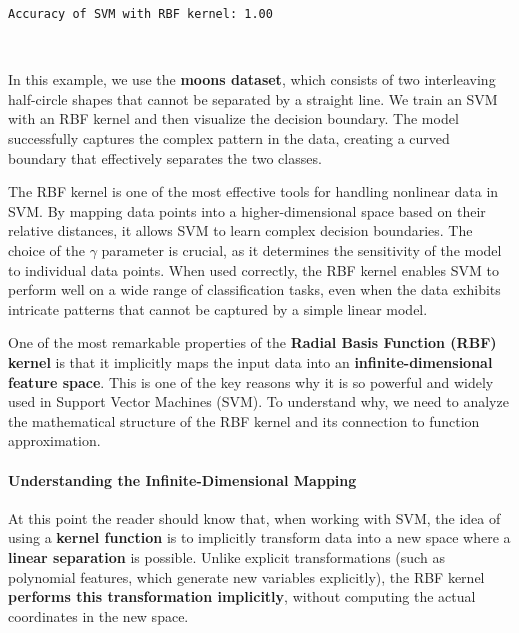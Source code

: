 \documentclass[11pt]{article}
\begin{document}
    \begin{Verbatim}[commandchars=\\\{\}]
Accuracy of SVM with RBF kernel: 1.00
    \end{Verbatim}

    \begin{center}
    \end{center}
    { \hspace*{\fill} \\}
    
    In this example, we use the \textbf{moons dataset}, which consists of
two interleaving half-circle shapes that cannot be separated by a
straight line. We train an SVM with an RBF kernel and then visualize the
decision boundary. The model successfully captures the complex pattern
in the data, creating a curved boundary that effectively separates the
two classes.

The RBF kernel is one of the most effective tools for handling nonlinear
data in SVM. By mapping data points into a higher-dimensional space
based on their relative distances, it allows SVM to learn complex
decision boundaries. The choice of the $ \gamma $ parameter is
crucial, as it determines the sensitivity of the model to individual
data points. When used correctly, the RBF kernel enables SVM to perform
well on a wide range of classification tasks, even when the data
exhibits intricate patterns that cannot be captured by a simple linear
model.

    One of the most remarkable properties of the \textbf{Radial Basis
Function (RBF) kernel} is that it implicitly maps the input data into an
\textbf{infinite-dimensional feature space}. This is one of the key
reasons why it is so powerful and widely used in Support Vector Machines
(SVM). To understand why, we need to analyze the mathematical structure
of the RBF kernel and its connection to function approximation.

\paragraph{Understanding the Infinite-Dimensional
Mapping}\label{understanding-the-infinite-dimensional-mapping}

At this point the reader should know that, when working with SVM, the
idea of using a \textbf{kernel function} is to implicitly transform data
into a new space where a \textbf{linear separation} is possible. Unlike
explicit transformations (such as polynomial features, which generate
new variables explicitly), the RBF kernel \textbf{performs this
transformation implicitly}, without computing the actual coordinates in
the new space.
\end{document}
